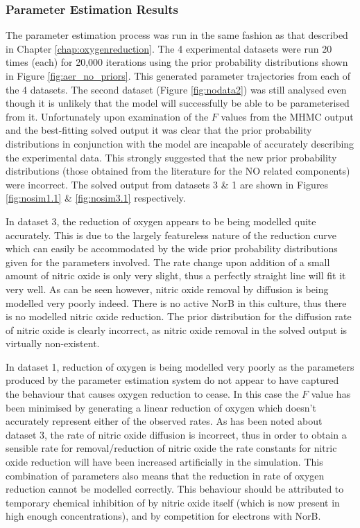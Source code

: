 \subsubsection{Parameter Estimation Results}
The parameter estimation process was run in the same fashion as that described in Chapter \ref{chap:oxygenreduction}. The 4 experimental datasets were run 20 times (each) for 20,000 iterations using the prior probability distributions shown in Figure \ref{fig:aer_no_priors}. This generated parameter trajectories from each of the 4 datasets. The second dataset (Figure \ref{fig:nodata2}) was still analysed even though it is unlikely that the model will successfully be able to be parameterised from it. Unfortunately upon examination of the $F$ values from the MHMC output and the best-fitting solved output it was clear that the prior probability distributions in conjunction with the model are incapable of accurately describing the experimental data. This strongly suggested that the new prior probability distributions (those obtained from the literature for the NO related components) were incorrect. The solved output from datasets 3 \& 1 are shown in Figures \ref{fig:nosim1.1} \& \ref{fig:nosim3.1} 
respectively.

In dataset 3, the reduction of oxygen appears to be being modelled quite accurately. This is due to the largely featureless nature of the reduction curve which can easily be accommodated by the wide prior probability distributions given for the parameters involved. The rate change upon addition of a small amount of nitric oxide is only very slight, thus a perfectly straight line will fit it very well. As can be seen however, nitric oxide removal by diffusion is being modelled very poorly indeed. There is no active NorB in this culture, thus there is no modelled nitric oxide reduction. The prior distribution for the diffusion rate of nitric oxide is clearly incorrect, as nitric oxide removal in the solved output is virtually non-existent.

In dataset 1, reduction of oxygen is being modelled very poorly as the parameters produced by the parameter estimation system do not appear to have captured the behaviour that causes oxygen reduction to cease. In this case the $F$ value has been minimised by generating a linear reduction of oxygen which doesn't accurately represent either of the observed rates. As has been noted about dataset 3, the rate of nitric oxide diffusion is incorrect, thus in order to obtain a sensible rate for removal/reduction of nitric oxide the rate constants for nitric oxide reduction will have been increased artificially in the simulation. This combination of parameters also means that the reduction in rate of oxygen reduction cannot be modelled correctly. This behaviour should be attributed to temporary chemical inhibition of \cbbthree{} by nitric oxide itself (which is now present in high enough concentrations), and by competition for electrons with NorB.

